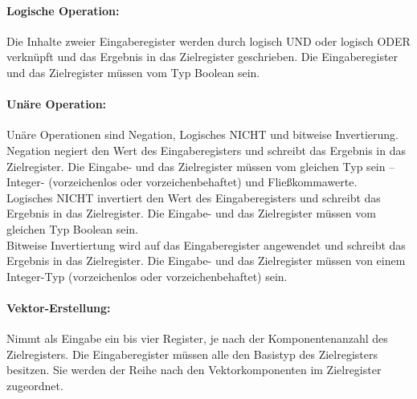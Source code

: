 \documentclass[twoside,a4paper,fleqn,12pt]{article}
\begin{document}
\paragraph{Logische Operation:} Die Inhalte zweier Eingaberegister werden durch logisch UND oder logisch ODER verknüpft und das Ergebnis in das Zielregister geschrieben.
Die Eingaberegister und das Zielregister müssen vom Typ Boolean sein.

\paragraph{Unäre Operation:} Unäre Operationen sind Negation, Logisches NICHT und bitweise Invertierung.
Negation negiert den Wert des Eingaberegisters und schreibt das Ergebnis in das Zielregister.
Die Eingabe- und das Zielregister müssen vom gleichen Typ sein -- Integer- (vorzeichenlos oder vorzeichenbehaftet) und Fließkommawerte.\\
Logisches NICHT invertiert den Wert des Eingaberegisters und schreibt das Ergebnis in das Zielregister.
Die Eingabe- und das Zielregister müssen vom gleichen Typ Boolean sein.\\
Bitweise Invertiertung wird auf das Eingaberegister angewendet und schreibt das Ergebnis in das Zielregister.
Die Eingabe- und das Zielregister müssen von einem Integer-Typ (vorzeichenlos oder vorzeichenbehaftet) sein.

\paragraph{Vektor-Erstellung:} Nimmt als Eingabe ein bis vier Register, je nach der Komponentenanzahl des Zielregisters. Die Eingaberegister müssen alle
den Basistyp des Zielregisters besitzen. Sie werden der Reihe nach den Vektorkomponenten im Zielregister zugeordnet.
\end{document}
